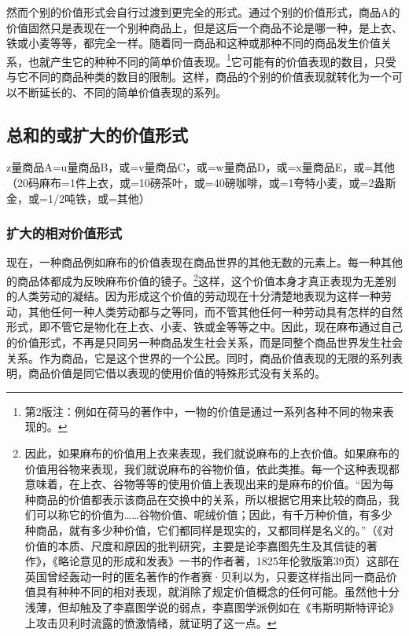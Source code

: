 \documentclass{ctexbook}
\begin{document}
            然而个别的价值形式会自行过渡到更完全的形式。通过个别的价值形式，商品A的价值固然只是表现在一个别种商品上，但是这后一个商品不论是哪一种，是上衣、铁或小麦等等，都完全一样。随着同一商品和这种或那种不同的商品发生价值关系，也就产生它的种种不同的简单价值表现。\footnote{第2版注：例如在荷马的著作中，一物的价值是通过一系列各种不同的物来表现的。}它可能有的价值表现的数目，只受与它不同的商品种类的数目的限制。这样，商品的个别的价值表现就转化为一个可以不断延长的、不同的简单价值表现的系列。

        \subsection{总和的或扩大的价值形式}

        \begin{center}
            z量商品A=u量商品B，或=v量商品C，或=w量商品D，或=x量商品E，或=其他\\
            （20码麻布=1件上衣，或=10磅茶叶，或=40磅咖啡，或=1夸特小麦，或=2盎斯金，或=1/2吨铁，或=其他）    
        \end{center}
        
            \subsubsection{扩大的相对价值形式}

            现在，一种商品例如麻布的价值表现在商品世界的其他无数的元素上。每一种其他的商品体都成为反映麻布价值的镜子。\footnote{因此，如果麻布的价值用上衣来表现，我们就说麻布的上衣价值。如果麻布的价值用谷物来表现，我们就说麻布的谷物价值，依此类推。每一个这种表现都意味着，在上衣、谷物等等的使用价值上表现出来的是麻布的价值。“因为每种商品的价值都表示该商品在交换中的关系，所以根据它用来比较的商品，我们可以称它的价值为……谷物价值、呢绒价值；因此，有千万种价值，有多少种商品，就有多少种价值，它们都同样是现实的，又都同样是名义的。”（《对价值的本质、尺度和原因的批判研究，主要是论李嘉图先生及其信徒的著作》，《略论意见的形成和发表》一书的作者著，1825年伦敦版第39页）这部在英国曾经轰动一时的匿名著作的作者赛·贝利以为，只要这样指出同一商品价值具有种种不同的相对表现，就消除了规定价值概念的任何可能。虽然他十分浅薄，但却触及了李嘉图学说的弱点，李嘉图学派例如在《韦斯明斯特评论》上攻击贝利时流露的愤激情绪，就证明了这一点。}这样，这个价值本身才真正表现为无差别的人类劳动的凝结。因为形成这个价值的劳动现在十分清楚地表现为这样一种劳动，其他任何一种人类劳动都与之等同，而不管其他任何一种劳动具有怎样的自然形式，即不管它是物化在上衣、小麦、铁或金等等之中。因此，现在麻布通过自己的价值形式，不再是只同另一种商品发生社会关系，而是同整个商品世界发生社会关系。作为商品，它是这个世界的一个公民。同时，商品价值表现的无限的系列表明，商品价值是同它借以表现的使用价值的特殊形式没有关系的。
            
\end{document}
